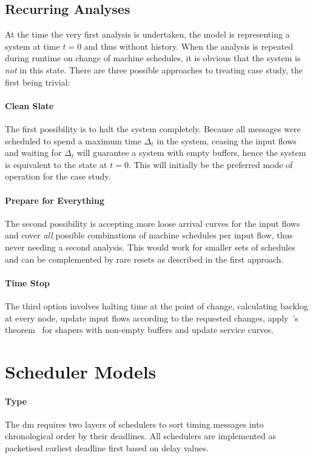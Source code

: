 \subsection{Recurring Analyses}
At the time the very first analysis is undertaken, the model is representing a system at time $t=0$ and thus without history.
When the analysis is repeated during runtime on change of machine schedules, it is obvious that the system is \emph{not} in this state.
There are three possible approaches to treating case study, the first being trivial:
\paragraph{Clean Slate} The first possibility is to halt the system completely. Because all messages were scheduled to spend a maximum time $\Delta_t$ in the system,
ceasing the input flows and waiting for $\Delta_t$ will guarantee a system with empty buffers, hence the system is equivalent to the state at $t=0$. This will initially be the preferred mode of operation for the case study.
\paragraph{Prepare for Everything} The second possibility is accepting more loose arrival curves for the input flows and cover \emph{all} possible combinations of machine schedules
per input flow, thus never needing a second analysis. This would work for smaller sets of schedules and can be complemented by rare resets as described in the first approach.
\paragraph{Time Stop} The third option involves halting time at the point of change, calculating backlog at every node, update input flows according
to the requested changes,  apply~\citeauthor{thiran_network_2001}'s theorem~\cite[p. 225]{thiran_network_2001} for shapers with non-empty buffers and update service curves.

\section{Scheduler Models}

\paragraph{Type}
The \gls{dm} requires two layers of schedulers to sort timing messages into chronological order by their deadlines.
All schedulers are implemented as packetised earliest deadline first based on delay values.
